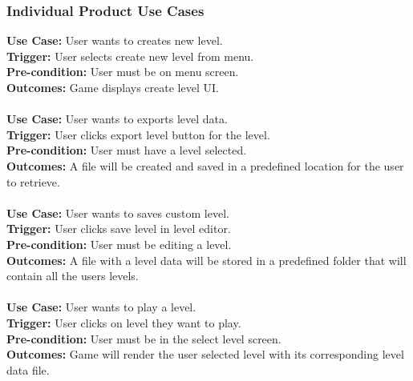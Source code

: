 \documentclass[12pt, titlepage]{article}
\begin{document}
\subsubsection{Individual Product Use Cases}
\textbf{Use Case:} User wants to creates new level.
\\\textbf{Trigger:} User selects create new level from menu.
\\\textbf{Pre-condition:} User must be on menu screen.
\\\textbf{Outcomes:} Game displays create level UI.
\\\\
\textbf{Use Case:} User wants to exports level data.
\\\textbf{Trigger:} User clicks export level button for the level.
\\\textbf{Pre-condition:} User must have a level selected.
\\\textbf{Outcomes:} A file will be created and saved in a predefined location for the user to retrieve.
\\\\
\textbf{Use Case:} User wants to saves custom level.
\\\textbf{Trigger:} User clicks save level in level editor.
\\\textbf{Pre-condition:} User must be editing a level.
\\\textbf{Outcomes:} A file with a level data will be stored in a predefined folder that will contain all the users levels.
\\\\
\textbf{Use Case:} User wants to play a level.
\\\textbf{Trigger:} User clicks on level they want to play.
\\\textbf{Pre-condition:} User must be in the select level screen.
\\\textbf{Outcomes:} Game will render the user selected level with its corresponding level data file.
\end{document}
